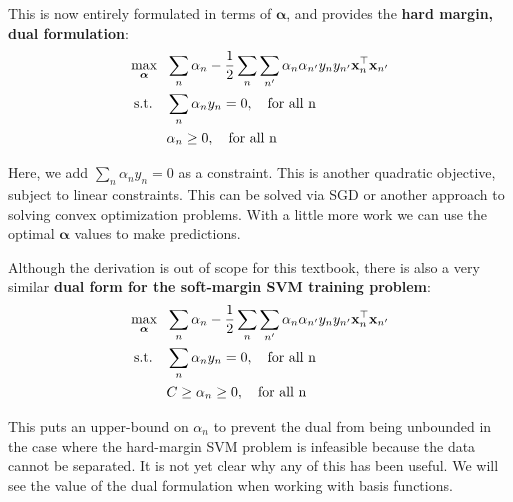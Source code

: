       \fi

      This is now entirely formulated in terms of $\boldsymbol{\alpha}$, and
      provides the {\bf hard margin, dual formulation}:
      \begin{align}
        \max_{\boldsymbol{\alpha}}\ \ & \sum_n\alpha_n - \frac{1}{2} \sum_{n} \sum_{n'} \alpha_{n} \alpha_{n'} y_{n} y_{n'} \textbf{x}_{n}^\top \textbf{x}_{n'}\\
        \mbox{s.t.}\quad & \sum_n\alpha_n y_n=0, \quad\mbox{for all n}\notag \\
                                      & \alpha_n \geq 0, \quad\mbox{for all n}\notag
                                        \end{align}

                                        Here, we add $ \sum_n\alpha_n y_n=0$ as a constraint.
                                        This is another quadratic objective, subject to linear constraints.  This can be solved via SGD or another approach to solving convex optimization problems.
                                        With a little more work we can use the optimal  $\boldsymbol{\alpha}$ values to make predictions.


                                        Although the derivation is out of scope for this textbook, there is also a very similar {\bf dual form for the soft-margin SVM training problem}:
%
      \begin{align}
        \max_{\boldsymbol{\alpha}}\ \ & \sum_n\alpha_n - \frac{1}{2} \sum_{n} \sum_{n'} \alpha_{n} \alpha_{n'} y_{n} y_{n'} \textbf{x}_{n}^\top \textbf{x}_{n'} \label{eq:dpsoft} \\
        \mbox{s.t.}\quad & \sum_n\alpha_n y_n=0, \quad\mbox{for all n}\notag \\
                                      & C \geq \alpha_n \geq 0, \quad\mbox{for all n}\notag
                                        \end{align}            
                                        
This puts an upper-bound on $\alpha_n$ to prevent the dual from being unbounded in the case where the hard-margin SVM problem is infeasible because the data cannot be separated. 
It is not yet clear why any of this has been useful. We will see the value of the dual formulation when working with basis functions.
                                        
                                        
